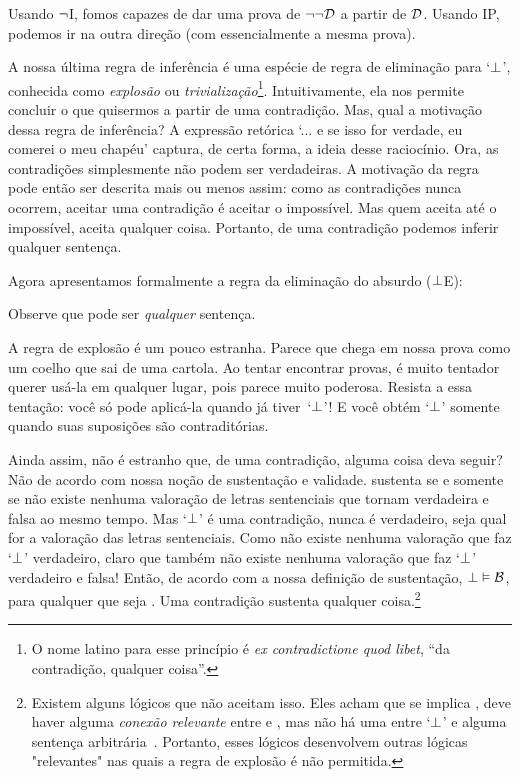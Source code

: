 Usando $\neg$I, fomos capazes de dar uma prova de $\neg\neg\mathcal{D}$ a partir de $\mathcal{D}$. Usando IP, podemos ir na outra direção (com essencialmente a mesma prova).
	\begin{fitchproof}
		\open
		\close
	\end{fitchproof}

A nossa última regra de inferência é uma espécie de regra de eliminação para `$\bot$', conhecida como \emph{explosão} ou \emph{trivialização}\footnote{O nome latino para esse princípio é  \emph{ex contradictione quod libet}, ``da contradição, qualquer coisa''.}.  Intuitivamente, ela nos permite concluir o que quisermos a partir de uma contradição. Mas, qual a motivação dessa regra de inferência? A expressão retórica `... e se isso for verdade, eu comerei o meu chapéu' captura, de certa forma, a ideia desse raciocínio. Ora, as contradições simplesmente não podem ser verdadeiras. A motivação da regra pode então ser descrita mais ou menos assim: como as contradições nunca ocorrem, aceitar uma contradição é aceitar o impossível. Mas quem aceita até o impossível, aceita qualquer coisa. Portanto, de uma contradição podemos inferir qualquer sentença.

Agora apresentamos formalmente a regra da eliminação do absurdo ($\bot$E):

Observe que   pode ser \emph{qualquer} sentença.

A regra de explosão é um pouco estranha. Parece que    chega em nossa prova como um coelho que sai de uma cartola. Ao tentar encontrar provas, é muito tentador querer usá-la em qualquer lugar, pois parece muito poderosa. Resista a essa tentação: você só pode aplicá-la quando já tiver~`$\bot$'!   E você obtém `$\bot$'   somente quando suas suposições são contraditórias.
 

Ainda assim, não é estranho que, de uma contradição, alguma coisa deva seguir? Não de acordo com nossa noção de sustentação e validade.  sustenta  se e somente se não existe nenhuma valoração de letras sentenciais que tornam  verdadeira e  falsa ao mesmo tempo. Mas `$\bot$' é uma contradição, nunca é verdadeiro, seja qual for a valoração das letras sentenciais.  Como não existe nenhuma valoração que faz  `$\bot$' verdadeiro, claro que também não existe nenhuma valoração que faz  `$\bot$'  verdadeiro e  falsa! Então, de acordo com a nossa definição de sustentação,  $\bot \vDash \mathcal{B}$,  para qualquer que seja . Uma contradição sustenta qualquer coisa.\footnote{Existem alguns lógicos que não aceitam isso. Eles acham que se  implica , deve haver alguma \emph{conexão relevante} entre  e , mas não há uma entre `$\bot$' e alguma sentença arbitrária~. Portanto, esses lógicos desenvolvem outras lógicas "relevantes" nas quais  a regra de explosão é não permitida.}

